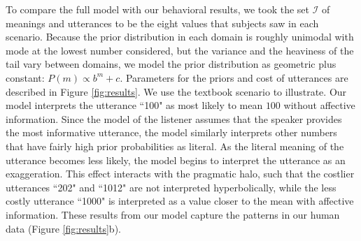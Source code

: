 \documentclass{article} %
\begin{document}
To compare the full model with our behavioral results, we took the set $\mathcal I$ of meanings and utterances to be the eight values that subjects saw in each scenario. Because the prior distribution in each domain is roughly unimodal with mode at the lowest number considered, but the variance and the heaviness of the tail vary between domains, we model the prior distribution as geometric plus constant:
$P(m)\propto b^{m} + c$. Parameters for the priors and cost of utterances are described in Figure \ref{fig:results}.
We use the textbook scenario to illustrate. Our model interprets the utterance ``100" as most likely to mean $100$ without affective information. Since the model of the listener assumes that the speaker provides the most informative utterance, the model similarly interprets other numbers that have fairly high prior probabilities as literal. As the literal meaning of the utterance becomes less likely, the model begins to interpret the utterance as an exaggeration. This effect interacts with the pragmatic halo, such that the costlier utterances ``202" and ``1012" are not interpreted hyperbolically, while the less costly utterance ``1000" is interpreted as a value closer to the mean with affective information. These results from our model capture the patterns in our human data (Figure \ref{fig:results}b). 
\end{document}
